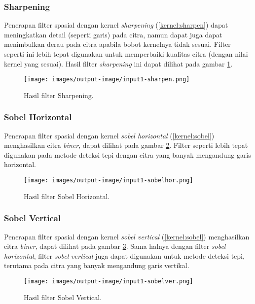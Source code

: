 \subsubsection{Sharpening}
Penerapan filter spasial dengan kernel \textit{sharpening} (\ref{kernel:sharpen}) dapat meningkatkan detail (seperti garis) pada citra, namun dapat juga dapat menimbulkan derau pada citra apabila bobot kernelnya tidak sesuai. Filter seperti ini lebih tepat digunakan untuk memperbaiki kualitas citra (dengan nilai kernel yang sesuai). Hasil filter \textit{sharpening} ini dapat dilihat pada gambar \ref{fig:output-sharpen}.
\begin{figure}
    \texttt{[image: images/output-image/input1-sharpen.png]}
    \caption{Hasil filter Sharpening.}
    \label{fig:output-sharpen}
\end{figure}

\subsubsection{Sobel Horizontal}
Penerapan filter spasial dengan kernel \textit{sobel horizontal} (\ref{kernel:sobel}) menghasilkan citra \textit{biner}, dapat dilihat pada gambar \ref{fig:output-sobelhor}. Filter seperti lebih tepat digunakan pada metode deteksi tepi dengan citra yang banyak mengandung garis horizontal.
\begin{figure}
    \texttt{[image: images/output-image/input1-sobelhor.png]}
    \caption{Hasil filter Sobel Horizontal.}
    \label{fig:output-sobelhor}
\end{figure}

\subsubsection{Sobel Vertical}
Penerapan filter spasial dengan kernel \textit{sobel vertical} (\ref{kernel:sobel}) menghasilkan citra \textit{biner}, dapat dilihat pada gambar \ref{fig:output-sobelver}. Sama halnya dengan filter \textit{sobel horizontal}, filter \textit{sobel vertical} juga dapat digunakan untuk metode deteksi tepi, terutama pada citra yang banyak mengandung garis vertikal.
\begin{figure}
    \texttt{[image: images/output-image/input1-sobelver.png]}
    \caption{Hasil filter Sobel Vertical.}
    \label{fig:output-sobelver}
\end{figure}


